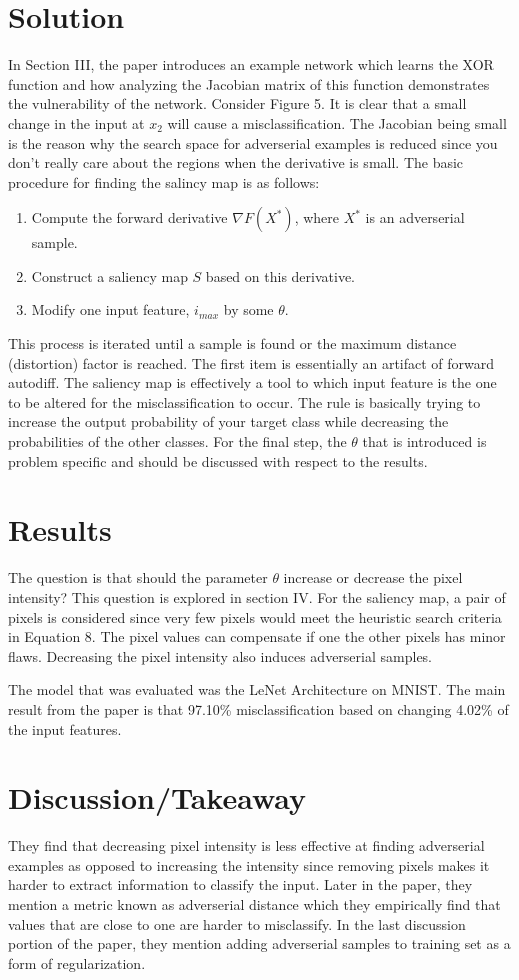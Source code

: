 \documentclass{article}
\begin{document}
\section{Solution}
In Section III, the paper introduces an example network which learns the XOR function and how analyzing the Jacobian matrix of this function demonstrates the vulnerability of the network. Consider Figure 5. It is clear that a small change in the input at $x_2$ will cause a misclassification. The Jacobian being small is the reason why the search space for adverserial examples is reduced since you don't really care about the regions when the derivative is small. The basic procedure for finding the salincy map is as follows:
\begin{enumerate}
	\item Compute the forward derivative $\nabla F(X^{*})$, where $X^{*}$ is an adverserial sample.
	\item Construct a saliency map $S$ based on this derivative.
	\item Modify one input feature, $i_{max}$ by some $\theta$.
\end{enumerate}
This process is iterated until a sample is found or the maximum distance (distortion) factor is reached. The first item is essentially an artifact of forward autodiff. The saliency map is effectively a tool to which input feature is the one to be altered for the misclassification to occur. The rule is basically trying to increase the output probability of your target class while decreasing the probabilities of the other classes. For the final step, the $\theta$ that is introduced is problem specific and should be discussed with respect to the results.
\section{Results}
The question is that should the parameter $\theta$ increase or decrease the pixel intensity? This question is explored in section IV. For the saliency map, a pair of pixels is considered since very few pixels would meet the heuristic search criteria in Equation 8. The pixel values can compensate if one the other pixels has minor flaws. Decreasing the pixel intensity also induces adverserial samples. 

The model that was evaluated was the LeNet Architecture on MNIST. The main result from the paper is that 97.10\% misclassification based on changing 4.02\% of the input features.   
\section{Discussion/Takeaway}
They find that decreasing pixel intensity is less effective at finding adverserial examples as opposed to increasing the intensity since removing pixels makes it harder to extract information to classify the input. Later in the paper, they mention a metric known as adverserial distance which they empirically find that values that are close to one are harder to misclassify. In the last discussion portion of the paper, they mention adding adverserial samples to training set as a form of regularization.
\end{document}
